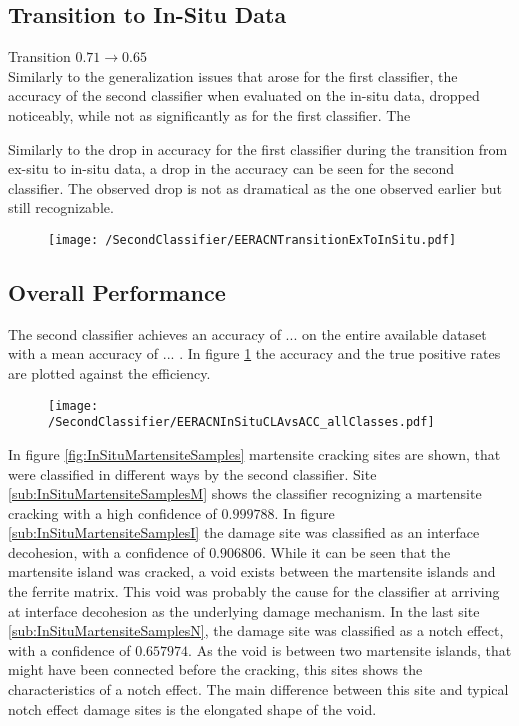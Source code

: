 \subsection{Transition to In-Situ Data}
Transition $0.71\rightarrow 0.65$\\

Similarly to the generalization issues that arose for the first classifier, the accuracy of the second classifier when evaluated on the in-situ data, dropped noticeably, while not as significantly as for the first classifier. The 

Similarly to the drop in accuracy for the first classifier during the transition from ex-situ to in-situ data, a drop in the accuracy can be seen for the second classifier. The observed drop is not as dramatical as the one observed earlier but still recognizable.

\begin{figure}[H]
\centering
\texttt{[image: /SecondClassifier/EERACNTransitionExToInSitu.pdf]}
\end{figure}


\subsection{Overall Performance}

The second classifier achieves an accuracy of ... on the entire available dataset with a mean accuracy of ... . In figure \ref{fig:SecondClassifierOverallAllClasses} the accuracy and the true positive rates are plotted against the efficiency. \\

\begin{figure}
\centering
\texttt{[image: /SecondClassifier/EERACNInSituCLAvsACC\_allClasses.pdf]}
\caption{}
\label{fig:SecondClassifierOverallAllClasses}
\end{figure}

In figure \ref{fig:InSituMartensiteSamples} martensite cracking sites are shown, that were classified in different ways by the second classifier. Site \ref{sub:InSituMartensiteSamplesM} shows the classifier recognizing a martensite cracking with a high confidence of $0.999788$. In figure \ref{sub:InSituMartensiteSamplesI} the damage site was classified as an interface decohesion, with a confidence of $0.906806$. While it can be seen that the martensite island was cracked, a void exists between the martensite islands and the ferrite matrix. This void was probably the cause for the classifier at arriving at interface decohesion as the underlying damage mechanism. In the last site \ref{sub:InSituMartensiteSamplesN}, the damage site was classified as a notch effect, with a confidence of $0.657974$. As the void is between two martensite islands, that might have been connected before the cracking, this sites shows the characteristics of a notch effect. The main difference between this site and typical notch effect damage sites is the elongated shape of the void.

